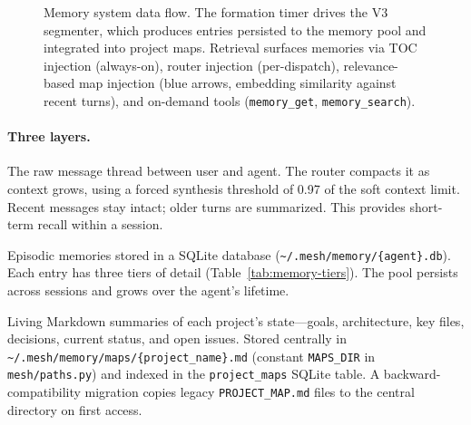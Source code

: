 \documentclass[11pt,a4paper]{article}
\newcommand{\code}[1]{\texttt{#1}}
\begin{document}
\begin{figure}[h]
\caption{Memory system data flow. The formation timer drives the V3
segmenter, which produces entries persisted to the memory pool and
integrated into project maps. Retrieval surfaces memories via TOC
injection (always-on), router injection (per-dispatch), relevance-based
map injection (blue arrows, embedding similarity against recent turns),
and on-demand tools (\code{memory\_get}, \code{memory\_search}).}
\label{fig:memory}
\end{figure}

\paragraph{Three layers.}
\begin{description}[nosep, leftmargin=1.5em]
  \item[Conversation history] The raw message thread between user and
    agent. The router compacts it as context grows, using a forced
    synthesis threshold of 0.97 of the soft context limit. Recent
    messages stay intact; older turns are summarized. This provides
    short-term recall within a session.
  \item[Memory pool] Episodic memories stored in a SQLite database
    (\code{\textasciitilde/.mesh/memory/\{agent\}.db}). Each entry has
    three tiers of detail (Table~\ref{tab:memory-tiers}). The pool
    persists across sessions and grows over the agent's lifetime.
  \item[Project maps] Living Markdown summaries of each project's
    state---goals, architecture, key files, decisions, current status,
    and open issues. Stored centrally in
    \code{\textasciitilde/.mesh/memory/maps/\{project\_name\}.md}
    (constant \code{MAPS\_DIR} in \code{mesh/paths.py}) and indexed in
    the \code{project\_maps} SQLite table. A backward-compatibility
    migration copies legacy \code{PROJECT\_MAP.md} files to the central
    directory on first access.
\end{description}
\end{document}
